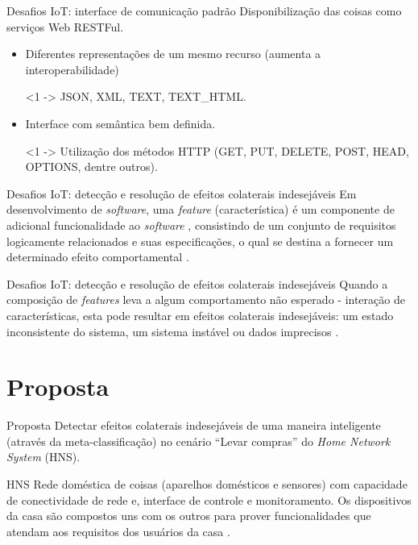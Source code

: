 \documentclass[brazil]{beamer}
\begin{document}
\begin{frame}{Desafios IoT: interface de comunicação padrão}
Disponibilização das coisas como serviços Web RESTFul.
  \begin{itemize}
    \item <1 ->Diferentes representações de um mesmo recurso (aumenta a interoperabilidade)
   \begin{examples}<1 ->
       JSON, XML, TEXT, TEXT\_HTML.
   \end{examples}
    \item <2 - >Interface com semântica bem definida.
   \begin{examples}<1 ->
          Utilização dos métodos HTTP (GET, PUT, DELETE, POST, HEAD, OPTIONS, dentre outros).
   \end{examples}
  \end{itemize}
\end{frame}

\begin{frame}{Desafios IoT: detecção e resolução de efeitos colaterais indesejáveis}
Em desenvolvimento de \textit{software}, uma \alert{\textit{feature} (característica)} é um componente de adicional funcionalidade ao \textit{software} \cite{Calder:2003}, consistindo de um conjunto de requisitos logicamente relacionados e suas especificações, o qual se destina a fornecer um determinado efeito comportamental \cite{NHLABATSI:2008}.
\end{frame}

\begin{frame}{Desafios IoT: detecção e resolução de efeitos colaterais indesejáveis}
Quando a \alert{composição de \textit{features}} leva a algum \alert{comportamento não esperado} - interação de características, esta pode resultar em \alert{efeitos colaterais indesejáveis}: um estado inconsistente do sistema, um sistema instável ou dados imprecisos \cite{NHLABATSI:2008}.
\end{frame}

\section{Proposta}
\begin{frame}{Proposta}
Detectar efeitos colaterais indesejáveis de uma maneira inteligente (através da meta-classificação) no cenário ``Levar compras'' do \textit{Home Network System} (HNS).
\end{frame}

\begin{frame}{HNS}
Rede doméstica de coisas (aparelhos domésticos e sensores) com capacidade de conectividade de rede e, interface de controle e monitoramento. Os dispositivos da casa são compostos uns com os outros para prover funcionalidades que atendam aos requisitos dos usuários da casa \cite{Ikegami:2013}.
\end{frame}
\end{document}
